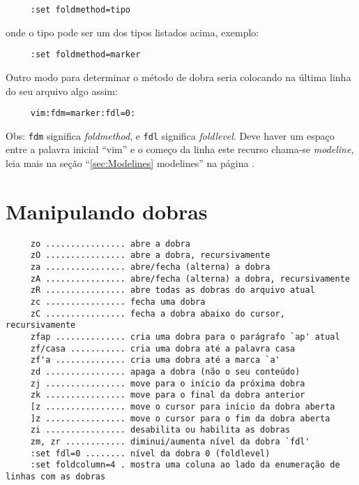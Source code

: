 \begin{verbatim}
     :set foldmethod=tipo
\end{verbatim}

onde o tipo pode ser um dos tipos listados acima, exemplo:

\begin{verbatim}
     :set foldmethod=marker
\end{verbatim}

Outro modo para determinar o método de dobra seria colocando na última
linha do seu arquivo algo assim:

\begin{verbatim}
     vim:fdm=marker:fdl=0:
\end{verbatim}

Obs: \verb|fdm| significa {\em foldmethod}, e \verb|fdl| significa
{\em foldlevel}. Deve haver um espaço entre a palavra inicial ``vim'' e o
começo da linha este recurso chama-se {\em modeline}, leia mais na seção
``\ref{sec:Modelines} modelines'' na página \pageref{sec:Modelines}.

\section{Manipulando dobras }\label{Manipulando dobras }

\begin{verbatim}
     zo ................ abre a dobra
     zO ................ abre a dobra, recursivamente
     za ................ abre/fecha (alterna) a dobra
     zA ................ abre/fecha (alterna) a dobra, recursivamente
     zR ................ abre todas as dobras do arquivo atual
     zc ................ fecha uma dobra
     zC ................ fecha a dobra abaixo do cursor, recursivamente
     zfap .............. cria uma dobra para o parágrafo `ap' atual
     zf/casa ........... cria uma dobra até a palavra casa
     zf'a .............. cria uma dobra até a marca `a'
     zd ................ apaga a dobra (não o seu conteúdo)
     zj ................ move para o início da próxima dobra
     zk ................ move para o final da dobra anterior
     [z ................ move o cursor para início da dobra aberta
     ]z ................ move o cursor para o fim da dobra aberta
     zi ................ desabilita ou habilita as dobras
     zm, zr ............ diminui/aumenta nível da dobra `fdl'
     :set fdl=0 ........ nível da dobra 0 (foldlevel)
     :set foldcolumn=4 . mostra uma coluna ao lado da enumeração de linhas com as dobras
\end{verbatim}

